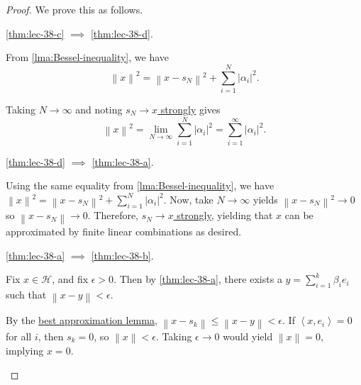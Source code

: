 \begin{proof}
	We prove this as follows.
	\begin{claim}
		\autoref{thm:lec-38-c} \(\implies \) \autoref{thm:lec-38-d}.
	\end{claim}
	\begin{explanation}
		From \autoref{lma:Bessel-inequality}, we have
		\[
			\left\lVert x\right\rVert^2 = \left\lVert x - s_N\right\rVert^2 + \sum_{i=1}^N \left\vert \alpha_i \right\vert ^2.
		\]

		Taking \(N \to \infty\) and noting \hyperref[def:strong-convergence]{\(s_N \to x\) strongly} gives
		\[
			\left\lVert x\right\rVert^2 = \lim_{N \to \infty} \sum_{i=1}^N \left\vert \alpha_i \right\vert ^2 = \sum_{i=1}^\infty \left\vert \alpha_i \right\vert ^2.
		\]
	\end{explanation}

	\begin{claim}
		\autoref{thm:lec-38-d} \(\implies \) \autoref{thm:lec-38-a}.
	\end{claim}
	\begin{explanation}
		Using the same equality from \autoref{lma:Bessel-inequality}, we have \(\left\lVert x\right\rVert^2 = \left\lVert x - s_N\right\rVert^2 + \sum_{i=1}^N \left\vert \alpha_i \right\vert ^2\). Now, take \(N \to \infty\) yields \(\left\lVert x - s_N\right\rVert^2 \to 0\) so \(\left\lVert x - s_N\right\rVert \to 0\). Therefore, \hyperref[def:strong-convergence]{\(s_N \to x\) strongly}, yielding that \(x\) can be approximated by finite linear combinations as desired.
	\end{explanation}

	\begin{claim}
		\autoref{thm:lec-38-a} \(\implies \) \autoref{thm:lec-38-b}.
	\end{claim}
	\begin{explanation}
		Fix \(x \in \mathcal{H}\), and fix \(\epsilon > 0\). Then by \autoref{thm:lec-38-a}, there exists a \(y = \sum_{i=1}^k \beta_i e_i\) such that \(\left\lVert x - y\right\rVert < \epsilon\).

		By the \hyperref[lma:best-approximation]{best approximation lemma}, \(\left\lVert x - s_k\right\rVert \leq \left\lVert x - y\right\rVert < \epsilon \). If \(\left< x,e_i \right> = 0\) for all \(i\), then \(s_k = 0\), so \(\left\lVert x\right\rVert < \epsilon \). Taking \(\epsilon \to 0\) would yield \(\left\lVert x\right\rVert = 0\), implying \(x = 0\).
	\end{explanation}


\end{proof}
